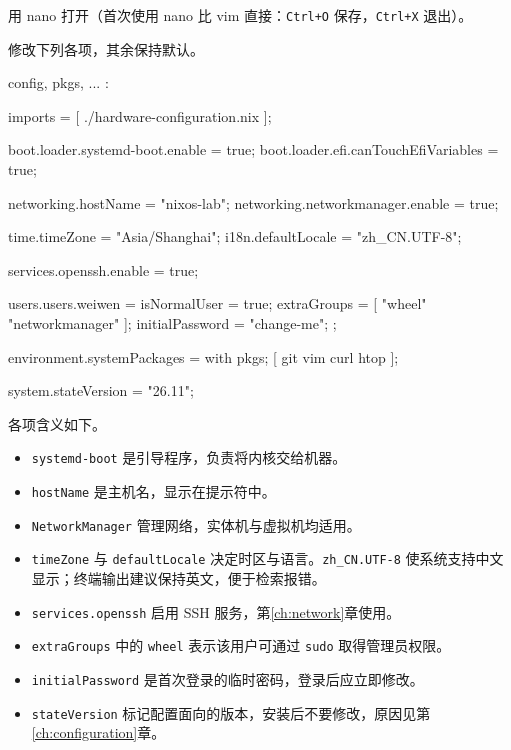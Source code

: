 用 nano 打开（首次使用 nano 比 vim 直接：\texttt{Ctrl+O} 保存，\texttt{Ctrl+X} 退出）。


修改下列各项，其余保持默认。

\begin{nixcode}
{ config, pkgs, ... }:

{
  imports = [ ./hardware-configuration.nix ];

  boot.loader.systemd-boot.enable = true;
  boot.loader.efi.canTouchEfiVariables = true;

  networking.hostName = "nixos-lab";
  networking.networkmanager.enable = true;

  time.timeZone = "Asia/Shanghai";
  i18n.defaultLocale = "zh_CN.UTF-8";

  services.openssh.enable = true;

  users.users.weiwen = {
    isNormalUser = true;
    extraGroups = [
      "wheel"
      "networkmanager"
    ];
    initialPassword = "change-me";
  };

  environment.systemPackages = with pkgs; [
    git
    vim
    curl
    htop
  ];

  system.stateVersion = "26.11";
}
\end{nixcode}

各项含义如下。

\begin{itemize}
  \item \texttt{systemd-boot} 是引导程序，负责将内核交给机器。
  \item \texttt{hostName} 是主机名，显示在提示符中。
  \item \texttt{NetworkManager} 管理网络，实体机与虚拟机均适用。
  \item \texttt{timeZone} 与 \texttt{defaultLocale} 决定时区与语言。\texttt{zh\_CN.UTF-8} 使系统支持中文显示；终端输出建议保持英文，便于检索报错。
  \item \texttt{services.\allowbreak{}openssh} 启用 SSH 服务，第\ref{ch:network}章使用。
  \item \texttt{extraGroups} 中的 \texttt{wheel} 表示该用户可通过 \texttt{sudo} 取得管理员权限。
  \item \texttt{initialPassword} 是首次登录的临时密码，登录后应立即修改。
  \item \texttt{stateVersion} 标记配置面向的版本，安装后不要修改，原因见第\ref{ch:configuration}章。
\end{itemize}

